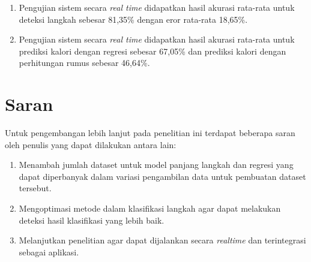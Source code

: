 \begin{enumerate}[nolistsep]
  \item Pengujian sistem secara \emph{real time} didapatkan hasil akurasi rata-rata untuk deteksi langkah sebesar 81,35\% dengan eror rata-rata 18,65\%.
  
  \item Pengujian sistem secara \emph{real time} didapatkan hasil akurasi rata-rata untuk prediksi kalori dengan regresi sebesar 67,05\% dan prediksi kalori dengan perhitungan rumus sebesar 46,64\%.

\end{enumerate}

\section{Saran}
\label{chap:saran}

Untuk pengembangan lebih lanjut pada penelitian ini terdapat beberapa saran oleh penulis yang dapat dilakukan antara lain:

\begin{enumerate}[nolistsep]

  \item Menambah jumlah dataset untuk model panjang langkah dan regresi yang dapat diperbanyak dalam variasi pengambilan data untuk pembuatan dataset tersebut.
  
  \item Mengoptimasi metode dalam klasifikasi langkah agar dapat melakukan deteksi hasil klasifikasi yang lebih baik.
  
  \item Melanjutkan penelitian agar dapat dijalankan secara \emph{realtime} dan terintegrasi sebagai aplikasi.

\end{enumerate}
